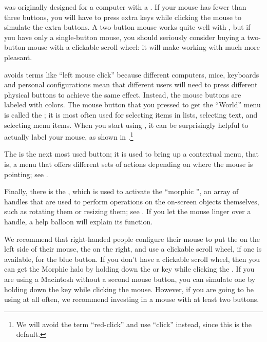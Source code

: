\documentclass[a4paper,10pt,twoside]{book}
\begin{document}
\sq was originally designed for a computer with a .  If your mouse has fewer than three buttons, you will have to press extra keys while clicking the mouse to simulate the extra buttons.  A two-button mouse works quite well with \sq, but if you have only a single-button mouse, you should seriously consider buying a two-button mouse with a clickable scroll wheel: it will make working with \sq much more pleasant.

\sq avoids terms like ``left mouse click'' because different computers, mice, keyboards and personal configurations mean that different users will need to press different physical buttons to achieve the same effect.  Instead, the mouse buttons are labeled with colors.  The mouse button that you pressed to get the ``World'' menu is called the ; it is most often used for selecting items in lists, selecting text, and selecting menu items.
When you start using \sq, it can be surprisingly helpful to actually label your mouse, as shown in .\footnote{We will avoid the term ``red-click'' and use ``click'' instead, since this is the default.}

The  is the next most used button; it is used to bring up a contextual menu, that is, a menu that offers different sets of actions depending on where the mouse is pointing; see .


Finally, there is the , which is used to activate the ``morphic '', an array of handles that are used to perform operations on the on-screen objects themselves, such as rotating them or resizing them; see . 
If you let the mouse linger over a handle, a help balloon will explain its function.


We recommend that right-handed people configure their mouse to put the  on the left side of their mouse, the  on the right, and use a clickable scroll wheel, if one is available, for the blue button.  If you don't have a clickable scroll wheel, then you can get the Morphic halo by holding down the  or  key while clicking the .  If you are using a Macintosh without a second mouse button, you can simulate one by holding down the \clover{} key while clicking the mouse.  However, if you are going to be using \sq at all often, we recommend investing in a mouse with at least two buttons.
\end{document}
